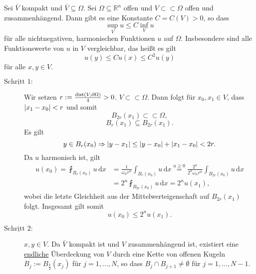 \begin{satz}
	Sei $\bar{V}$ kompakt und $\bar{V} \subseteq \Omega$. Sei $\Omega \subseteq  \mathbb{R}^n$ offen und $V \subset \subset \Omega $ offen und
	zusammenhängend. Dann gibt es eine Konstante $C = C(V) >0$, so dass
	\begin{equation}
		\sup_{V}u \leq C \inf_{V}u
	\end{equation}
	für alle nichtnegativen, harmonischen Funktionen $u$ auf $\Omega$. Insbesondere sind alle Funktionswerte von $u$ in $V$ vergleichbar, das heißt es gilt
	\begin{equation}
		u(y) \leq C u(x) \leq C^2 u(y)
	\end{equation}
	für alle $x,y \in V$.
\end{satz}
\begin{beweis}
	\begin{description}
		\item[$\underline{\text{Schritt }1:}$] Wir setzen $r:= \frac{\operatorname{dist}(V,\partial \Omega)}{4} > 0$. $V \subset \subset \Omega$. Dann folgt für $x_0,x_1 \in V$, dass $\lvert x_1-x_0\rvert< r$ und somit
		\begin{equation}
			B_{2r}(x_1) \subset \subset \Omega ,
		\end{equation}
		\begin{equation}
			B_r(x_1) \subseteq B_{2r}(x_1).
		\end{equation}
		Es gilt
		\begin{equation}
			y \in B_r(x_0) \Rightarrow \lvert y-x_1\rvert \leq \lvert y-x_0\rvert + \lvert x_1 - x_0\rvert < 2r.
		\end{equation}
		Da $u$ harmonisch ist, gilt
		\begin{align*}
			u(x_0) = \fint_{B_r(x_0)}^{} u \,\mathrm{d}x &= \frac{1}{\omega_n r^n} \int_{B_r(x_0)}^{}u\,\mathrm{d}x \stackrel{u \geq 0}{=} \frac{2^n}{2^n \omega_n r^n}
			\int_{B_{2r}(x_0)}^{}u \,\mathrm{d}x \\ &= 2^n \fint_{B_{2r}(x_0)}^{}u \,\mathrm{d}x = 2^n u(x_1),
		\end{align*}
		wobei die letzte Gleichheit aus der Mittelwerteigenschaft auf $B_{2r}(x_1)$ folgt. Insgesamt gilt somit
		\[
			u(x_0) \leq 2^n u(x_1).
		\]
		\item[$\underline{\text{Schritt }2:}$] $x,y \in V$. 
		Da $\bar{V}$ kompakt ist und $V$ zusammenhängend ist, existiert eine \underline{endliche} Überdeckung von $V$ 
		durch eine Kette von offenen Kugeln $B_j := B_{\frac{k}{2}}(x_j)$ für $j=1,\dots,N$, so dass $B_j \cap B_{j+1} \neq \emptyset$ für $j=1,\dots,N-1$.

\end{description}
\end{beweis}

